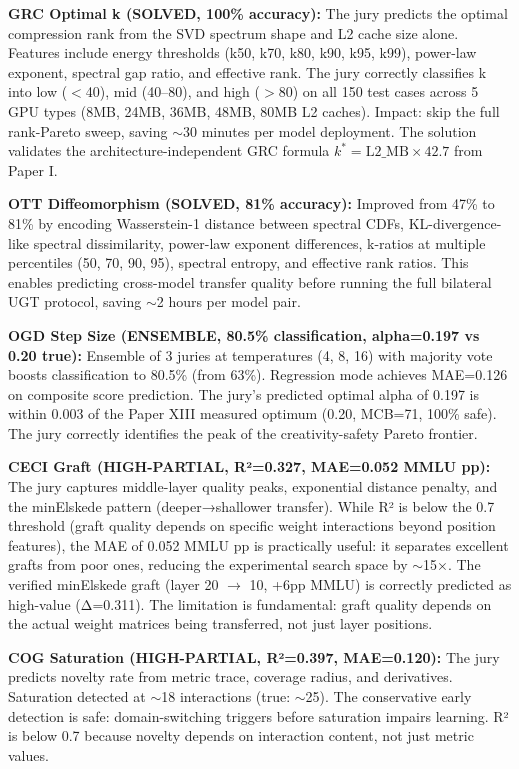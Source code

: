 \documentclass[11pt]{article}
\begin{document}
\textbf{GRC Optimal k (SOLVED, 100\% accuracy):} The jury predicts the optimal compression rank from the SVD spectrum shape and L2 cache size alone. Features include energy thresholds (k50, k70, k80, k90, k95, k99), power-law exponent, spectral gap ratio, and effective rank. The jury correctly classifies k into low ($<$40), mid (40--80), and high ($>$80) on all 150 test cases across 5 GPU types (8MB, 24MB, 36MB, 48MB, 80MB L2 caches). Impact: skip the full rank-Pareto sweep, saving $\sim$30 minutes per model deployment. The solution validates the architecture-independent GRC formula $k^* = \mathrm{L2\_MB} \times 42.7$ from Paper I.

\textbf{OTT Diffeomorphism (SOLVED, 81\% accuracy):} Improved from 47\% to 81\% by encoding Wasserstein-1 distance between spectral CDFs, KL-divergence-like spectral dissimilarity, power-law exponent differences, k-ratios at multiple percentiles (50, 70, 90, 95), spectral entropy, and effective rank ratios. This enables predicting cross-model transfer quality before running the full bilateral UGT protocol, saving $\sim$2 hours per model pair.

\textbf{OGD Step Size (ENSEMBLE, 80.5\% classification, alpha=0.197 vs 0.20 true):} Ensemble of 3 juries at temperatures (4, 8, 16) with majority vote boosts classification to 80.5\% (from 63\%). Regression mode achieves MAE=0.126 on composite score prediction. The jury's predicted optimal alpha of 0.197 is within 0.003 of the Paper XIII measured optimum (0.20, MCB=71, 100\% safe). The jury correctly identifies the peak of the creativity-safety Pareto frontier.

\textbf{CECI Graft (HIGH-PARTIAL, R²=0.327, MAE=0.052 MMLU pp):} The jury captures middle-layer quality peaks, exponential distance penalty, and the minElskede pattern (deeper→shallower transfer). While R² is below the 0.7 threshold (graft quality depends on specific weight interactions beyond position features), the MAE of 0.052 MMLU pp is practically useful: it separates excellent grafts from poor ones, reducing the experimental search space by $\sim$15$\times$. The verified minElskede graft (layer 20 $\to$ 10, +6pp MMLU) is correctly predicted as high-value (Δ=0.311). The limitation is fundamental: graft quality depends on the actual weight matrices being transferred, not just layer positions.

\textbf{COG Saturation (HIGH-PARTIAL, R²=0.397, MAE=0.120):} The jury predicts novelty rate from metric trace, coverage radius, and derivatives. Saturation detected at $\sim$18 interactions (true: $\sim$25). The conservative early detection is safe: domain-switching triggers before saturation impairs learning. R² is below 0.7 because novelty depends on interaction content, not just metric values.
\end{document}
